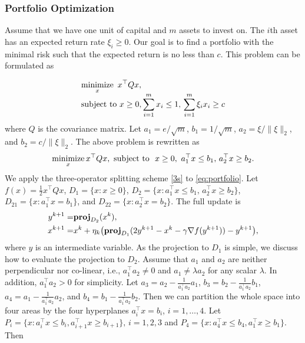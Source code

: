\subsubsection{Portfolio Optimization}
Assume that we have one unit of capital and $m$ assets to invest on. The $i$th asset has an expected return rate $\xi_i\ge 0$. Our goal is to find a portfolio with the minimal risk such that the expected return is no less than $c$. This problem can be formulated as

\begin{equation*}
\begin{array}{l}
\displaystyle
\Min_x ~x^\top Q x, \\
\displaystyle
\text{subject to}~ x\ge0, \sum_{i=1}^m x_i\le 1,\, \sum_{i=1}^m\xi_i x_i\ge c 
\end{array}
\end{equation*}
where $Q$ is the covariance matrix. Let $a_1=e/\sqrt{m}$, $b_1=1/\sqrt{m}$, $a_2=\xi/\|\xi\|_2$, and $b_2=c/\|\xi\|_2$. The above problem is rewritten as
\begin{equation}\label{eq:portfolio}
\Min_x x^\top Q x,\ \text{subject to }\ x\ge0, ~a_1^\top x\le b_1,\, a_2^\top x\ge b_2.
\end{equation}
We apply the three-operator splitting scheme \eqref{3s} to \eqref{eq:portfolio}. Let $f(x)=\frac{1}{2}x^\top Q x$, $D_1=\{x: x\ge 0\}$, $D_2=\{x: a_1^\top x \le b_1,\, a_2^\top x\ge b_2\}$, $D_{21}=\{x: a_1^\top x=b_1\}$, and $D_{22}=\{x: a_2^\top x=b_2\}$. The full update is
\begin{subequations}\label{eq:3op-portfolio}
\begin{align}
y^{k+1}=&\prj_{D_2}(x^k),\\
x^{k+1}=&x^k+\eta_k\big(\prj_{D_1}(2y^{k+1}-x^k-\gamma \nabla f(y^{k+1}))-y^{k+1}\big), \end{align}
\end{subequations}
where $y$ is an intermediate variable. As the projection to $D_1$ is simple, we discuss how to evaluate the projection to $D_2$. Assume that $a_1$ and $a_2$ are neither perpendicular nor co-linear, i.e., $a_1^\top a_2\neq 0$ and $a_1\neq \lambda a_2$ for any scalar $\lambda$. In addition, $a_1^\top a_2>0$ for simplicity. Let $a_3=a_2-\frac{1}{a_1^\top a_2} a_1$, $b_3=b_2-\frac{1}{a_1^\top a_2} b_1$, $a_4=a_1-\frac{1}{a_1^\top a_2} a_2$, and $b_4=b_1-\frac{1}{a_1^\top a_2} b_2$. Then we can partition the whole space into four areas by the four hyperplanes $a_i^\top x=b_i$, $i=1,\ldots,4$. Let $P_i=\{x: a_i^\top x\le b_i, a_{i+1}^\top x\ge b_{i+1}\},\, i=1,2,3$ and $P_4=\{x: a_4^\top x\le b_4, a_1^\top x\ge b_1\}$. Then
